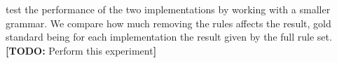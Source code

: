 \documentclass[11pt]{article}
\newcommand{\todo}[1]{{\color{cyan}\textbf{[TODO: }#1\textbf{]}}}
\begin{document}
test the performance of the two implementations by working with a smaller grammar. We compare how much removing the rules affects the result, gold standard being for each implementation the result given by the full rule set.
\todo{Perform this experiment}








\end{document}
